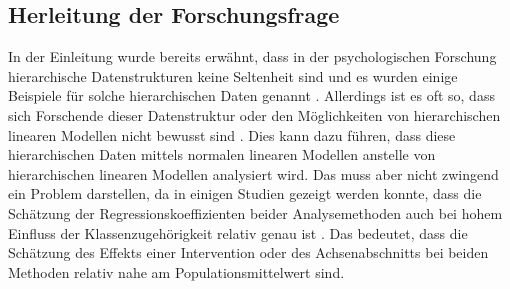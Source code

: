 \documentclass[12pt]{article}\usepackage[]{graphicx}\usepackage[]{color}
\begin{document}
\subsection{Herleitung der Forschungsfrage}
In der Einleitung wurde bereits erwähnt, dass in der psychologischen Forschung hierarchische Datenstrukturen keine Seltenheit sind und es wurden einige Beispiele für solche hierarchischen Daten genannt \citep{raudenbush2002hierarchical,SnijdersTomA.B2012Ma:a,woltman2012introduction}. Allerdings ist es oft so, dass sich Forschende dieser Datenstruktur oder den Möglichkeiten von hierarchischen linearen Modellen nicht bewusst sind \citep{mcneish2014analyzing}. Dies kann dazu führen, dass diese hierarchischen Daten mittels normalen linearen Modellen anstelle von hierarchischen linearen Modellen analysiert wird. Das muss aber nicht zwingend ein Problem darstellen, da in einigen Studien gezeigt werden konnte, dass die Schätzung der Regressionskoeffizienten beider Analysemethoden auch bei hohem Einfluss der Klassenzugehörigkeit relativ genau ist \citep{mcneish2014analyzing, mundfrom2002monte}. Das bedeutet, dass die Schätzung des Effekts einer Intervention oder des Achsenabschnitts bei beiden Methoden relativ nahe am Populationsmittelwert sind. 
\end{document}
